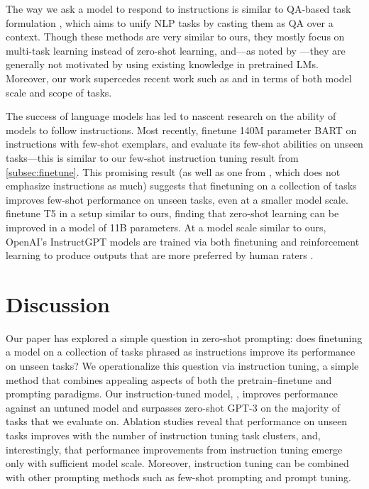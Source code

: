 The way we ask a model to respond to instructions is similar to QA-based task formulation \citep{kumar2016ask,mccann2018natural}, which aims to unify NLP tasks by casting them as QA over a context.
Though these methods are very similar to ours, they mostly focus on multi-task learning instead of zero-shot learning, and---as noted by \citet{liu2021survey}---they are generally not motivated by using existing knowledge in pretrained LMs.
Moreover, our work supercedes recent work such as \citet{chai2020description} and \citet{zhong2021meta} in terms of both model scale and scope of tasks.

The success of language models has led to nascent research on the ability of models to follow instructions. 
Most recently, \citet{mishra2021natural} finetune 140M parameter BART on instructions with few-shot exemplars, and evaluate its few-shot abilities on unseen tasks---this is similar to our few-shot instruction tuning result from \cref{subsec:finetune}.
This promising result (as well as one from \citet{ye2021crossfit}, which does not emphasize instructions as much) suggests that finetuning on a collection of tasks improves few-shot performance on unseen tasks, even at a smaller model scale.
\citet{sanh2021multitask} finetune T5 in a setup similar to ours, finding that zero-shot learning can be improved in a model of 11B parameters.
At a model scale similar to ours, OpenAI's InstructGPT models are trained via both finetuning and reinforcement learning to produce outputs that are more preferred by human raters \citep{ouyang2022instructgpt}.

\section{Discussion}

Our paper has explored a simple question in zero-shot prompting: does finetuning a model on a collection of tasks phrased as instructions improve its performance on unseen tasks?
We operationalize this question via instruction tuning, a simple method that combines appealing aspects of both the pretrain--finetune and prompting paradigms.
Our instruction-tuned model, \flan{}, improves performance against an untuned model and surpasses zero-shot GPT-3 on the majority of tasks that we evaluate on.
Ablation studies reveal that performance on unseen tasks improves with the number of instruction tuning task clusters, and, interestingly, that performance improvements from instruction tuning emerge only with sufficient model scale.
Moreover, instruction tuning can be combined with other prompting methods such as few-shot prompting and prompt tuning.


